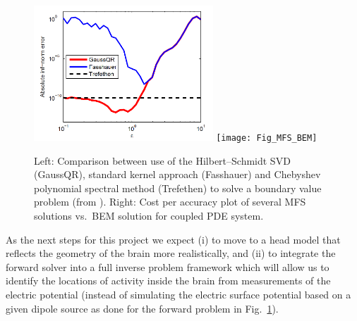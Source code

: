 \documentclass[11pt]{NSFamsart}
\begin{document}
\begin{figure}[h]
    \centering
    \includegraphics[height=2in]{HSSVD_BVP}
    \texttt{[image: Fig\_MFS\_BEM]}
\caption{Left: Comparison between use of the Hilbert--Schmidt SVD (GaussQR), standard kernel approach (Fasshauer) and Chebyshev polynomial spectral method (Trefethen) to solve a boundary value problem (from \citep{McCourt13}). Right: Cost per accuracy plot of several MFS solutions vs.\ BEM solution for coupled PDE system.}\label{Fig_MFS_BEM}
\end{figure}

As the next steps for this project we expect (i) to move to a head model that reflects the geometry of the brain more realistically, and (ii) to integrate the forward solver into a full inverse problem framework which will allow us to identify the locations of activity inside the brain from measurements of the electric potential (instead of simulating the electric surface potential based on a given dipole source as done for the forward problem in Fig.~\ref{Fig_MFS_BEM}).
\end{document}
